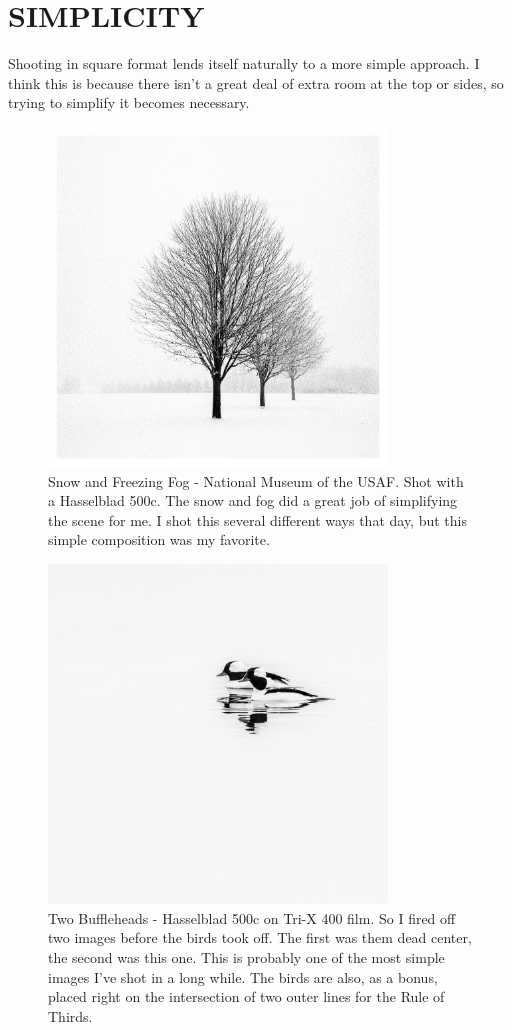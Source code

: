 \documentclass[a4paper]{article}
\begin{document}
\section*{SIMPLICITY}
Shooting in square format lends itself naturally to a more simple approach. I think this is because there isn’t a great deal of extra room at the top or sides, so trying to simplify it becomes necessary.  

\begin{figure}[ht!]
    \centering
    \includegraphics[width=90mm]{img/46248701704_c6af502fba_k.jpeg}
    \caption{Snow and Freezing Fog - National Museum of the USAF. Shot with a Hasselblad 500c. The snow and fog did a great job of simplifying the scene for me. I shot this several different ways that day, but this simple composition was my favorite.}
\end{figure}

\begin{figure}[ht!]
    \centering
    \includegraphics[width=90mm]{img/45972195685_ae6d923431_k.jpeg}
    \caption{Two Buffleheads - Hasselblad 500c on Tri-X 400 film. So I fired off two images before the birds took off. The first was them dead center, the second was this one. This is probably one of the most simple images I’ve shot in a long while. The birds are also, as a bonus, placed right on the intersection of two outer lines for the Rule of Thirds.}
\end{figure}
\end{document}
